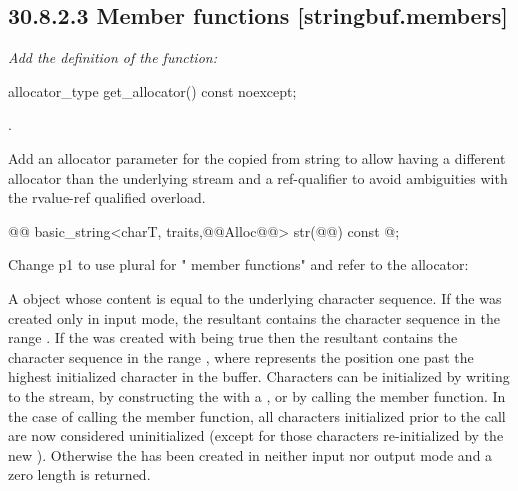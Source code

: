 \documentclass[ebook,11pt,article]{memoir}
\begin{document}
\subsection{30.8.2.3 Member functions [stringbuf.members]}
\textit{Add the definition of the  function:}
\begin{addedblock}
\begin{itemdecl}
allocator_type get_allocator() const noexcept;
\end{itemdecl}

\begin{itemdescr}
\pnum
\returns {}.

\end{itemdescr}
\end{addedblock}




Add an allocator parameter for the copied from string to allow having a different allocator than the underlying stream and a ref-qualifier to avoid ambiguities with the rvalue-ref qualified overload.
\begin{codeblock}
@@
basic_string<charT, traits,@@Alloc@@> str(@@) const @\added{\&};
\end{codeblock}

Change p1 to use plural for " member functions" and refer to the allocator:

\begin{itemdescr}
\pnum
\returns
A
object whose content is equal to the
underlying character sequence.
If the  was created only in input mode, the resultant
 contains the character sequence in the range
. If the  was created with
 being true then the resultant 
contains the character sequence in the range , where
 represents the position one past the highest initialized character
in the buffer. Characters can be initialized by writing to the stream, by constructing
the  with a , or by calling 
the
 member function. In the case of calling 
the
 member function, all characters initialized prior to
the call are now considered uninitialized (except for those characters re-initialized
by the new ). Otherwise the  has been created
in neither input nor output mode and a zero length  is returned. 
\end{itemdescr}
\end{document}
